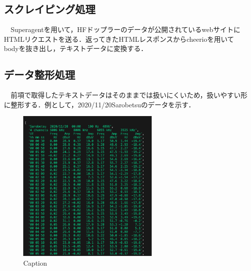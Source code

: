 \subsection{スクレイピング処理}
　Superagentを用いて，HFドップラーのデータが公開されているwebサイト\cite{hfd}にHTMLリクエストを送る．返ってきたHTMLレスポンスからcheerioを用いてbodyを抜き出し，テキストデータに変換する．
\subsection{データ整形処理}
　前項で取得したテキストデータはそのままでは扱いにくいため，扱いやすい形に整形する．例として，2020/11/20Sarobetsuのデータを示す．
 \begin{figure}[h]
   \centering
   \caption{Caption}
   \label{fig:my_label}
   \includegraphics[width=70mm]{fig/textdata.png}
 \end{figure}
